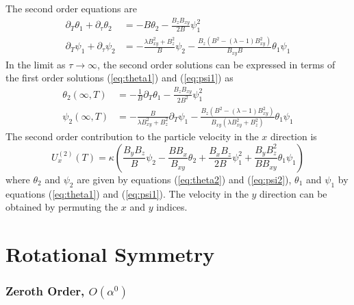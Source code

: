 \begin{appendices}
The second order equations are 
\begin{align}
    \partial_T \theta_1 + \partial_{\tau} \theta_2 &= -B \theta_2 - \frac{B_z B_{xy}}{2B}\psi_1^2
    \\
    \partial_T \psi_1 + \partial_{\tau} \psi_2 &=  -\frac{\lambda B_{xy}^2 + B_z^2}{B} \psi _2 - \frac{B_z (B^2 - (\lambda-1)B_{xy}^2)}{B_{xy} B}  \theta_1 \psi_1 
\end{align}
In the limit as $\tau\rightarrow\infty$, the second order solutions can be expressed in terms of the first order solutions (\ref{eq:theta1}) and (\ref{eq:psi1}) as 
\begin{align}
    \theta_2(\infty,T) &= - \frac{1}{B}\partial_T \theta_1 - \frac{B_z B_{xy}}{2 B^2} \psi_1^2 \label{eq:theta2}
    \\
    \psi_2(\infty,T) &= - \frac{B }{\lambda B_{xy}^2 + B_z^2} \partial_T \psi_1 - \frac{B_z (B^2 - (\lambda-1)B_{xy}^2)}{B_{xy} (\lambda B_{xy}^2 + B_z^2)}  \theta_1 \psi_1  \label{eq:psi2}
\end{align}
The second order contribution to the particle velocity in the $x$ direction is 
\begin{equation}
    U_x^{(2)}(T) = \kappa  \left(\frac{B_y B_z}{B}\psi_2 - \frac{B B_x}{B_{xy}} \theta_2 + \frac{B_x B_z}{2 B}\psi_1^2 + \frac{B_y B_z^2}{B B_{xy}}\theta_1 \psi_1 \right)
\end{equation}
where $\theta_2$ and $\psi_2$ are given by equations (\ref{eq:theta2}) and (\ref{eq:psi2}), $\theta_1$ and $\psi_1$ by equations (\ref{eq:theta1}) and (\ref{eq:psi1}). The velocity in the $y$ direction can be obtained by permuting the $x$ and $y$ indices.

\section{Rotational Symmetry}

\subsubsection{Zeroth Order, $O(\alpha^0)$}


\end{appendices}
